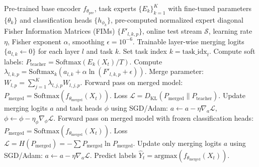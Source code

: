 \documentclass{article}
\theoremstyle{plain}
\theoremstyle{definition}
\theoremstyle{remark}
\begin{document}
\begin{algorithm}[tb]
  \caption{FiT-Merge: Fisher-Modulated Test-Time Adaptation}
  \label{alg:fit_merge}
  \begin{algorithmic}
    \footnotesize
     Pre-trained base encoder $f_{\theta_{\text{pre}}}$, task experts $\{E_k\}_{k=1}^K$ with fine-tuned parameters $\{\theta_k\}$ and classification heads $\{h_{\phi_k}\}$, pre-computed normalized expert diagonal Fisher Information Matrices (FIMs) $\{F'_{l,k,p}\}$, online test stream $\mathcal{S}$, learning rate $\eta$, Fisher exponent $\alpha$, smoothing $\epsilon=10^{-6}$.
     Trainable layer-wise merging logits $\{a_{l,k} \leftarrow 0\}$ for each layer $l$ and task $k$.
      \STATE Set task index $k = \text{task\_idx}_t$.
        \STATE Compute soft labels: $P_{\text{teacher}} = \text{Softmax}(E_k(X_t) / T)$.
      \ENDIF
        \STATE Compute $\lambda_{l,k,p} = \text{Softmax}_k \left( a_{l,k} + \alpha \ln(F'_{l,k,p} + \epsilon) \right)$.
        \STATE Merge parameter: $W_{l,p} = \sum_{j=1}^K \lambda_{l,j,p} W_{l,j,p}$.
      \ENDFOR
        \STATE Forward pass on merged model: $P_{\text{merged}} = \text{Softmax}(f_{\theta_{\text{merged}}}(X_t))$.
        \STATE Loss $\mathcal{L} = D_{\text{KL}}(P_{\text{merged}} \parallel P_{\text{teacher}})$.
        \STATE Update merging logits $a$ and task heads $\phi$ using SGD/Adam:
        \STATE $a \leftarrow a - \eta \nabla_a \mathcal{L}$, $\phi \leftarrow \phi - \eta_{\phi} \nabla_{\phi} \mathcal{L}$.
        \STATE Forward pass on merged model with frozen classification heads:
        \STATE $P_{\text{merged}} = \text{Softmax}(f_{\theta_{\text{merged}}}(X_t))$.
        \STATE Loss $\mathcal{L} = H(P_{\text{merged}}) = -\sum P_{\text{merged}} \ln P_{\text{merged}}$.
        \STATE Update only merging logits $a$ using SGD/Adam:
        \STATE $a \leftarrow a - \eta \nabla_a \mathcal{L}$.
      \ENDIF
      \STATE Predict labels $\hat{Y}_t = \text{argmax}(f_{\theta_{\text{merged}}}(X_t))$.
    \ENDFOR
  \end{algorithmic}
\end{algorithm}
\end{document}
